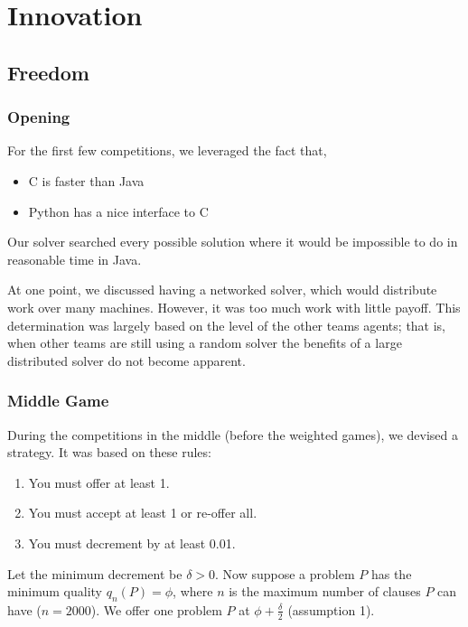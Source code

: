 \documentclass[letterpaper,12pt,oneside]{article}
\begin{document}
\section{Innovation}

\setcounter{subsection}{-1}
\setcounter{subsubsection}{-1}
\subsection{Freedom}

\subsubsection{Opening}
For the first few competitions, we leveraged the fact that,
\begin{itemize}
\item C is faster than Java
\item Python has a nice interface to C
\end{itemize}
Our solver searched every possible solution where it would be impossible to
do in reasonable time in Java.

At one point, we discussed having a networked solver, which would
distribute work over many machines. However, it was too much work with
little payoff. This determination was largely based on the level of the other
teams agents; that is, when other teams are still using a random solver the
benefits of a large distributed solver do not become apparent.

\subsubsection{Middle Game}

During the competitions in the middle (before the weighted games), we
devised a strategy. It was based on these rules:
\begin{enumerate}
\item You must offer at least 1.
\item You must accept at least 1 or re-offer all.
\item You must decrement by at least 0.01.
\end{enumerate}

Let the minimum decrement be $\delta > 0$.
Now suppose a problem $P$ has the minimum quality $q_n(P) = \phi$, where $n$
is the maximum number of clauses $P$ can have ($n = 2000$).
We offer one problem $P$ at $\phi + \frac{\delta}{2}$ (assumption 1).
\end{document}
